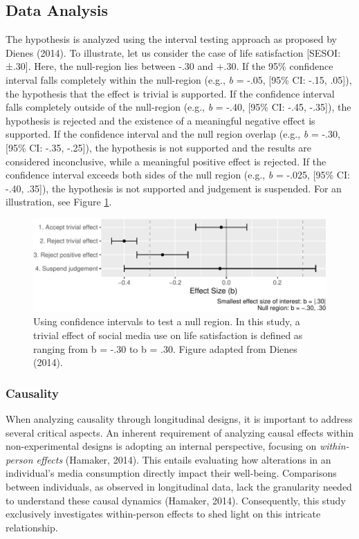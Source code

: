 \documentclass[
  man,mask,floatsintext]{apa7}
\begin{document}
\hypertarget{data-analysis}{%
\subsection{Data Analysis}\label{data-analysis}}

The hypothesis is analyzed using the interval testing approach as proposed by Dienes (2014).
To illustrate, let us consider the case of life satisfaction {[}SESOI: ±.30{]}.
Here, the null-region lies between -.30 and +.30.
If the 95\% confidence interval falls completely within the null-region (e.g., \emph{b} = -.05, {[}95\% CI: -.15, .05{]}), the hypothesis that the effect is trivial is supported.
If the confidence interval falls completely outside of the null-region (e.g., \emph{b} = -.40, {[}95\% CI: -.45, -.35{]}), the hypothesis is rejected and the existence of a meaningful negative effect is supported.
If the confidence interval and the null region overlap (e.g., \emph{b} = -.30, {[}95\% CI: -.35, -.25{]}), the hypothesis is not supported and the results are considered inconclusive, while a meaningful positive effect is rejected.
If the confidence interval exceeds both sides of the null region (e.g., \emph{b} = -.025, {[}95\% CI: -.40, .35{]}), the hypothesis is not supported and judgement is suspended.
For an illustration, see Figure \ref{fig:sesoi}.

\begin{figure}
\centering
\includegraphics{manuscript_files/figure-latex/sesoi-1.pdf}
\caption{\label{fig:sesoi}Using confidence intervals to test a null region. In this study, a trivial effect of social media use on life satisfaction is defined as ranging from b = -.30 to b = .30. Figure adapted from Dienes (2014).}
\end{figure}

\hypertarget{causality}{%
\subsubsection{Causality}\label{causality}}

When analyzing causality through longitudinal designs, it is important to address several critical aspects. An inherent requirement of analyzing causal effects within non-experimental designs is adopting an internal perspective, focusing on \emph{within-person effects} (Hamaker, 2014). This entails evaluating how alterations in an individual's media consumption directly impact their well-being. Comparisons between individuals, as observed in longitudinal data, lack the granularity needed to understand these causal dynamics (Hamaker, 2014). Consequently, this study exclusively investigates within-person effects to shed light on this intricate relationship.
\end{document}
